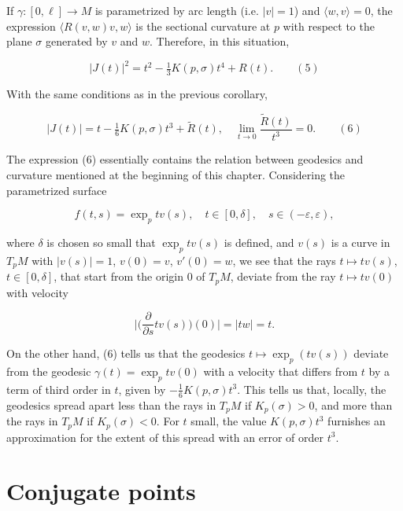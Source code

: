 \begin{corollary}[Corollary 2.9]
  \label{cor:dc-ch5-2-9}
  If $\gamma:[0,\ell]\to M$ is parametrized by arc length (i.e. $|v|=1$) and
  $\langle w,v\rangle=0$, the expression $\langle R(v,w)v,w\rangle$ is the sectional
  curvature at $p$ with respect to the plane $\sigma$ generated by $v$ and $w$.
  Therefore, in this situation,
  
  $$
  |J(t)|^2=t^2-\tfrac{1}{3}K(p,\sigma)t^4+R(t).\qquad(5)
  $$
\end{corollary}

\begin{corollary}[Corollary 2.10]
  \label{cor:dc-ch5-2-10}
  With the same conditions as in the previous corollary,
  
  $$
  |J(t)|=t-\tfrac{1}{6}K(p,\sigma)t^3+\tilde R(t),\quad\lim_{t\to 0}\frac{\tilde R(t)}{t^3}=0.\qquad(6)
  $$
\end{corollary}

\begin{remark}[Remark 2.11]
  \label{rem:dc-ch5-2-11}
  The expression (6) essentially contains the relation between geodesics and
  curvature mentioned at the beginning of this chapter. Considering the
  parametrized surface
  
  $$
  f(t,s)=\exp_p tv(s),\quad t\in[0,\delta],\quad s\in(-\varepsilon,\varepsilon),
  $$
  
  where $\delta$ is chosen so small that $\exp_p tv(s)$ is defined, and $v(s)$ is a
  curve in $T_p M$ with $|v(s)|=1$, $v(0)=v$, $v'(0)=w$, we see that the rays
  $t\mapsto tv(s)$, $t\in[0,\delta]$, that start from the origin $0$ of $T_p M$,
  deviate from the ray $t\mapsto tv(0)$ with velocity
  
  $$
  \Big|\Big(\frac{\partial}{\partial s}tv(s)\Big)(0)\Big|=|tw|=t.
  $$
  
  On the other hand, (6) tells us that the geodesics $t\mapsto\exp_p(tv(s))$
  deviate from the geodesic $\gamma(t)=\exp_p tv(0)$ with a velocity that differs
  from $t$ by a term of third order in $t$, given by $-\tfrac{1}{6}K(p,\sigma)t^3$.
  This tells us that, locally, the geodesics spread apart less than the rays in
  $T_p M$ if $K_p(\sigma)>0$, and more than the rays in $T_p M$ if $K_p(\sigma)<0$.
  For $t$ small, the value $K(p,\sigma)t^3$ furnishes an approximation for the
  extent of this spread with an error of order $t^3$.
\end{remark}

\section{Conjugate points}

